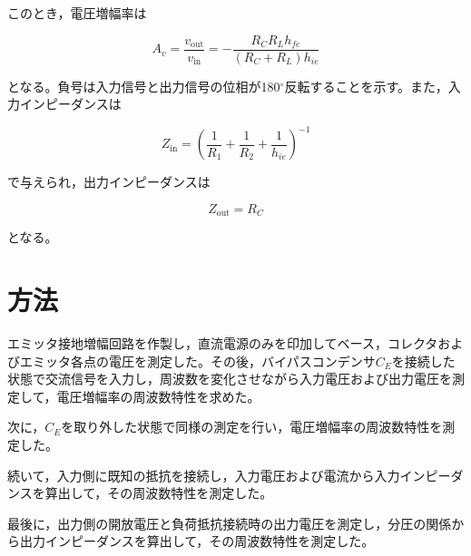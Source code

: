 \documentclass[11pt,a4paper]{jsarticle}
\begin{document}
このとき，電圧増幅率は

\begin{equation}
A_v=\frac{v_{\mathrm{out}}}{v_{\mathrm{in}}}
=
-\frac{R_CR_Lh_{fe}}
{(R_C+R_L)h_{ie}}
\end{equation}

となる。負号は入力信号と出力信号の位相が180$^\circ$反転することを示す。また，入力インピーダンスは

\begin{equation}
Z_{\mathrm{in}}
=
\left(
\frac{1}{R_1}
+\frac{1}{R_2}
+\frac{1}{h_{ie}}
\right)^{-1}
\end{equation}

で与えられ，出力インピーダンスは

\begin{equation}
Z_{\mathrm{out}}=R_C
\end{equation}

となる。

\section{方法}

エミッタ接地増幅回路を作製し，直流電源のみを印加してベース，コレクタおよびエミッタ各点の電圧を測定した。その後，バイパスコンデンサ$C_E$を接続した状態で交流信号を入力し，周波数を変化させながら入力電圧および出力電圧を測定して，電圧増幅率の周波数特性を求めた。

次に，$C_E$を取り外した状態で同様の測定を行い，電圧増幅率の周波数特性を測定した。

続いて，入力側に既知の抵抗を接続し，入力電圧および電流から入力インピーダンスを算出して，その周波数特性を測定した。

最後に，出力側の開放電圧と負荷抵抗接続時の出力電圧を測定し，分圧の関係から出力インピーダンスを算出して，その周波数特性を測定した。
\end{document}

